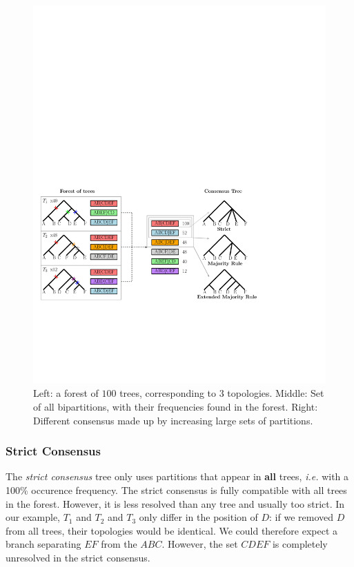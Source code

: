 \begin{figure}
 \includegraphics[width=0.9\linewidth]{Figs/consensus}
 \caption{Left: a forest of $100$ trees, corresponding to $3$ topologies. Middle: Set of all bipartitions, with their frequencies found in the forest. Right: Different consensus made up by increasing large sets of partitions.}
 \label{fig:consensus}
\end{figure}

\subsubsection{Strict Consensus}

The \emph{strict consensus} tree \citep{Rohlf1982} only uses partitions that appear in \textbf{all} trees, \emph{i.e.} with a 100\% occurence frequency. The strict consensus is fully compatible with all trees in the forest. However, it is less resolved than any tree and usually too strict. In our example, $T_1$ and $T_2$ and $T_3$ only differ in the position of $D$: if we removed $D$ from all trees, their topologies would be identical. We could therefore expect a branch separating $EF$ from the $ABC$. However, the set $CDEF$ is completely unresolved in the strict consensus. 

